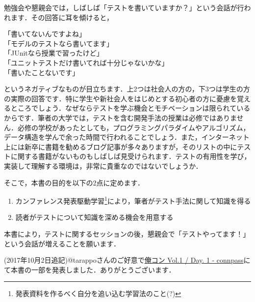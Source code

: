 勉強会や懇親会では，しばしば「テストを書いていますか？」という会話が行われます．その回答に耳を傾けると，

\begin{screen}%
\noindent 「書いてないんですよね」 \\
「モデルのテストなら書いてます」 \\
「JUnitなら授業で習ったけど」 \\
「ユニットテストだけ書いてれば十分じゃないかな」 \\
「書いたことないです」
\end{screen}

\noindent というネガティブなものが目立ちます．上2つは社会人の方の，下3つは学生の方の実際の回答です．特に学生や新社会人をはじめとする初心者の方に憂慮を覚えるところでしょう．なぜならテストを学ぶ機会とモチベーションは限られているからです．筆者の大学では，テストを含む開発手法の授業は必修ではありません．必修の学校があったとしても，プログラミングパラダイムやアルゴリズム，データ構造を学んで余った時間で行われることでしょう．また，インターネット上には新卒に書籍を勧めるブログ記事が多々ありますが，そのリストの中にテストに関する書籍がないものもしばしば見受けられます．テストの有用性を学び，実装して理解する環境は，非常に貴重なのではないでしょうか．

そこで，本書の目的を以下の2点に定めます．

\begin{enumerate}
    \item カンファレンス発表駆動学習\footnote{発表資料を作るべく自分を追い込む学習法のこと(?)}により，筆者がテスト手法に関して知識を得る
    \item 読者がテストについて知識を深める機会を用意する
\end{enumerate}

\noindent 本書により，テストに関するセッションの後，懇親会で「テストやってます！」という会話が増えることを願います．

(2017年10月2日追記)@tarappoさんのご好意で\href{https://orecon.connpass.com/event/63769/}{俺コン Vol.1 / Day. 1 - connpass}にて本書の一部を発表しました．ありがとうございます．

